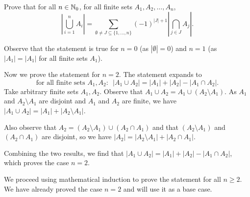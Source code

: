 \question
Prove that for all $n\in\mathbb{N}_0$, for all finite sets $A_1,A_2,\dots,A_n$, \[\left|\bigcup_{i=1}^n A_i\right| = \sum_{\emptyset\neq J\subseteq\{1,\dots,n\}}(-1)^{|J|+1}\left|\bigcap_{j\in J}A_j\right|.\]

\begin{solution}
	Observe that the statement is true for $n=0$ (as $|\emptyset|=0$) and $n=1$ (as $|A_1|=|A_1|$ for all finite sets $A_1$).

	Now we prove the statement for $n=2$. The statement expands to \[\text{for all finite sets $A_1, A_2$:}~~~|A_1\cup A_2|=|A_1|+|A_2|-|A_1\cap A_2|.\]
	Take arbitrary finite sets $A_1, A_2$. Observe that $A_1\cup A_2=A_1\cup(A_2\setminus A_1)$. As $A_1$ and $A_2\setminus A_1$ are disjoint and $A_1$ and $A_2$ are finite, we have $|A_1\cup A_2| = |A_1|+|A_2\setminus A_1|$.

	Also observe that $A_2=(A_2\setminus A_1)\cup(A_2\cap A_1)$ and that $(A_2\setminus A_1)$ and $(A_2\cap A_1)$ are disjoint, so we have $|A_2|=|A_2\setminus A_1|+|A_2\cap A_1|$.

	Combining the two results, we find that $|A_1\cup A_2|=|A_1|+|A_2|-|A_1\cap A_2|$, which proves the case $n=2$.

	We proceed using mathematical induction to prove the statement for all $n\geq2$. We have already proved the case $n=2$ and will use it as a base case.


\end{solution}
